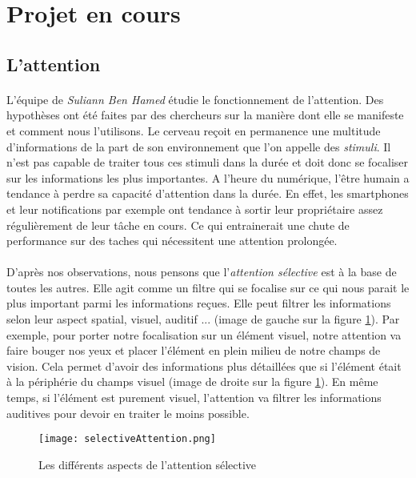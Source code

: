 \section{Projet en cours}

\subsection{L'attention}

\paragraph{}L'équipe de \emph{Suliann Ben Hamed} étudie le fonctionnement de l'attention. Des hypothèses ont été faites par des chercheurs sur la manière dont elle se manifeste et
comment nous l'utilisons. Le cerveau reçoit en permanence une multitude d'informations de la part de son environnement que l'on appelle des \emph{stimuli}. Il n'est pas capable de
traiter tous ces stimuli dans la durée et doit donc se focaliser sur les informations les plus importantes. A l'heure du numérique, l'être humain a tendance à perdre sa capacité
d'attention dans la durée. En effet, les smartphones et leur notifications par exemple ont tendance à sortir leur propriétaire assez régulièrement de leur tâche en cours. Ce qui
entrainerait une chute de performance sur des taches qui nécessitent une attention prolongée.

\paragraph{}D'après nos observations, nous pensons que l'\emph{attention sélective} est à la base de toutes les autres. Elle agit comme un filtre qui se focalise sur ce qui nous
parait le plus important parmi les informations reçues. Elle peut filtrer les informations selon leur aspect spatial, visuel, auditif ... (image de gauche sur la figure 
\ref{AspectSelectiveAttention}). Par exemple, pour porter notre focalisation sur un élément visuel, notre attention va faire bouger nos yeux et placer l'élément en plein milieu de
notre champs de vision. Cela permet d'avoir des informations plus détaillées que si l'élément était à la périphérie du champs visuel (image de droite sur la figure
\ref{AspectSelectiveAttention}). En même temps, si l'élément est purement visuel, l'attention va filtrer les informations auditives pour devoir en traiter le moins possible.

\begin{figure}[h]
    \begin{center}
    \texttt{[image: selectiveAttention.png]}
    \end{center}
    \caption{Les différents aspects de l'attention sélective}
\label{AspectSelectiveAttention}
\end{figure}

